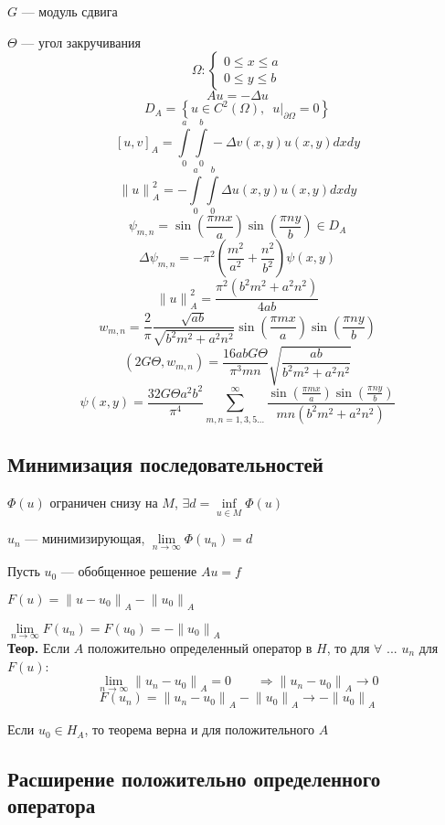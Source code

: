 \documentclass[12pt, a4paper]{article}
\newcommand{\Int}{\int\limits}
\newcommand{\Sum}{\sum\limits}
\begin{document}
$G$ --- модуль сдвига

$\Theta$ --- угол закручивания
\[ \Omega: \left\{ \begin{array}{l}
	0 \leq x \leq a  \\
	0 \leq y \leq b  
\end{array} \right. \]
\[ Au = -\Delta u \]
\[ D_A = \left\{ u \in C^2(\Omega), \enspace \left. u \right|_{\partial \Omega} = 0 \right\} \]
\[ {[u,v]}_A = \Int_{0}^{a} \Int_{0}^{b} -\Delta v(x,y)u(x,y)dxdy \]
\[ {\| u \|}^2_A = - \Int_{0}^{a} \Int_{0}^{b} \Delta u(x,y)u(x,y)dxdy \]
\[ \psi_{m,n} = \sin \left( \frac{\pi m x}{a} \right) \sin \left( \frac{\pi n y}{b} \right) \in D_A \]
\[ \Delta \psi_{m,n} = - \pi^2 \left( \frac{m^2}{a^2} + \frac{n^2}{b^2} \right) \psi (x, y) \]
\[ {\| u \|}^2_A = \frac{\pi^2 (b^2 m^2 + a^2 n^2)}{4ab} \]
\[ w_{m,n} = \frac{2}{\pi} \frac{\sqrt{ab}}{\sqrt{b^2 m^2 + a^2 n^2}} \sin \left( \frac{\pi m x}{a} \right) \sin \left( \frac{\pi n y}{b} \right) \]
\[ (2G\Theta, w_{m,n}) = \frac{16abG\Theta}{\pi^3 m n} \sqrt{\frac{ab}{b^2 m^2 + a^2 n^2}} \]
\[ \psi(x,y) = \frac{32G\Theta a^2b^2}{\pi^4} \Sum_{m,n=1,3,5...}^{\infty} \frac{\sin \left( \frac{\pi m x}{a} \right) \sin \left( \frac{\pi n y}{b} \right)}{mn (b^2 m^2 + a^2 n^2)} \]

\subsection{Минимизация последовательностей}

$ \Phi(u) $ ограничен снизу на $M$, \quad $\exists d = \underset{u \in M}{\inf} \Phi(u)$

$ {u_n}$ --- минимизирующая, \quad $ \underset{n \rightarrow \infty}{\lim} \Phi(u_n) = d $

Пусть $u_0$ --- обобщенное решение $Au = f$

$ F(u) = {\| u - u_0 \|}_A - {\| u_0 \|}_A $

$ \underset{n \rightarrow \infty}{\lim} F(u_n) = F(u_0) = - {\| u_0 \|}_A $ \\

\textbf{Теор.} Если $A$ положительно определенный оператор в $H$, то для $\forall$ ... ${u_n}$ для $F(u)$:
\[ \underset{n \rightarrow \infty}{\lim} {\| u_n - u_0 \|}_A = 0 \qquad \Rightarrow {\| u_n - u_0 \|}_A \rightarrow 0 \]
\[ F(u_n) = {\| u_n - u_0 \|}_A - {\| u_0 \|}_A \rightarrow -{\| u_0 \|}_A \]

Если $u_0 \in H_A$, то теорема верна и для положительного $A$

\subsection{Расширение положительно определенного оператора}
\end{document}
